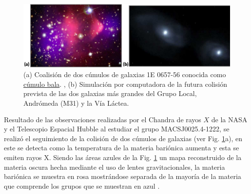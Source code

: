 \begin{figure}[htbp]
\centering
\includegraphics[width=.9\textwidth]{Cap1/imagenes/fritz2.png}
\caption[(a) Coalisión de dos cúmulos de galaxias 1E 0657-56 conocida como \href{https://en.wikipedia.org/wiki/Bullet_Cluster}{cúmulo bala}.
, (b) Simulación por computadora de la futura colisión prevista de las dos galaxias más grandes del Grupo Local, Andrómeda (M31) y la Vía Láctea. ]{
(a) Coalisión de dos cúmulos de galaxias 1E 0657-56 conocida como \href{https://en.wikipedia.org/wiki/Bullet_Cluster}{cúmulo bala}.
, (b) Simulación por computadora de la futura colisión prevista de las dos galaxias más grandes del Grupo Local, Andrómeda (M31) y la Vía Láctea. \footnotemark }
\label{coalision}
\end{figure}
 

Resultado de las observaciones realizadas por el Chandra de rayos $X$ de la NASA y el Telescopio Espacial Hubble al estudiar el grupo MACSJ0025.4-1222, se realizó el seguimiento de la colisión de dos cúmulos de galaxias (ver Fig. \ref{coalision}a), en este se detecta como la temperatura de la materia bariónica aumenta y esta se emiten rayos X. Siendo las áreas azules de la Fig. \ref{coalision} un mapa reconstruido de la materia oscura hecha mediante el uso de lentes gravitacionales, la materia bariónica se muestra en rosa mostrándose separada de la mayoría de la materia que comprende los grupos que se muestran en azul \citep{marsh_strings_2019}.





